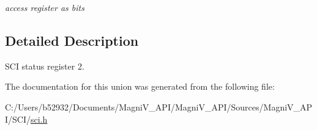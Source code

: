 \begin{DoxyCompactItemize}
\begin{tabbing}
\end{tabbing}\begin{DoxyCompactList}\small\item\em access register as bits \end{DoxyCompactList}\end{DoxyCompactItemize}


\subsection{Detailed Description}
S\+C\+I status register 2. 

The documentation for this union was generated from the following file\+:\begin{DoxyCompactItemize}
\item 
C\+:/\+Users/b52932/\+Documents/\+Magni\+V\+\_\+\+A\+P\+I/\+Magni\+V\+\_\+\+A\+P\+I/\+Sources/\+Magni\+V\+\_\+\+A\+P\+I/\+S\+C\+I/\hyperlink{sci_8h}{sci.\+h}\end{DoxyCompactItemize}
